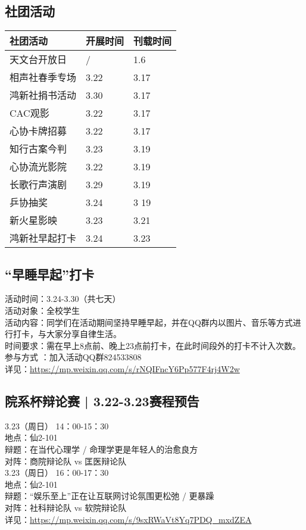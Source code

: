\documentclass[letterpaper, 12pt]{article}
\begin{document}
\begin{multicols}{2}
\section{社团活动}
\begin{tabular}{|>{\centering\arraybackslash}m{}|m{}|m{}|}
    \hline
    社团活动 & 开展时间 & 刊载时间\\
    \hline\hline
    天文台开放日 & / & 1.6\\
    相声社春季专场 & 3.22 & 3.17\\
    鸿新社捐书活动 & 3.30 & 3.17\\
    CAC观影 & 3.22 & 3.17\\
    心协卡牌招募 & 3.22 & 3.17\\
    知行古案今判 & 3.23 & 3.19\\
    心协流光影院 & 3.22 & 3.19\\
    长歌行声演剧 & 3.29 & 3.19\\
    乒协抽奖 & 3.24 & 3 19\\
    新火星影映 & 3.23 & 3.21\\
    鸿新社早起打卡 & 3.24 & 3.23\\
    \hline
\end{tabular}
\subsection{ “早睡早起”打卡}
活动时间：3.24-3.30（共七天）
\\活动对象：全校学生
\\活动内容：同学们在活动期间坚持早睡早起，并在QQ群内以图片、音乐等方式进行打卡，与大家分享自律生活。
\\时间要求：需在早上8点前、晚上23点前打卡，在此时间段外的打卡不计入次数。
\\参与方式 ：加入活动QQ群824533808
\\详见：\url{https://mp.weixin.qq.com/s/rNQIFncY6Pp577F4rj4W2w}
\subsection{院系杯辩论赛 | 3.22-3.23赛程预告}
3.23（周日） 14：00-15：30
\\地点：仙2-101
\\辩题：在当代心理学 / 命理学更是年轻人的治愈良方
\\对阵：商院辩论队 vs 匡医辩论队
\\3.23（周日） 16：00-17：30
\\地点：仙2-101
\\辩题：“娱乐至上”正在让互联网讨论氛围更松弛 / 更暴躁
\\对阵：社科辩论队 vs 软院辩论队
\\详见：\url{https://mp.weixin.qq.com/s/9sxRWaVt8Yq7PDQ_mxdZEA}
\end{multicols}
\end{document}
